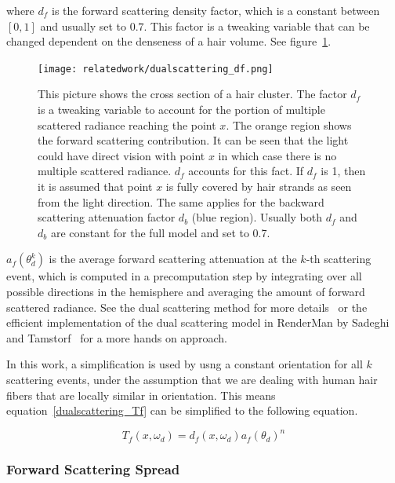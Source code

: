 where $d_f$ is the forward scattering density factor, which is a constant between $[0, 1]$ and usually set to $0.7$. This factor is a tweaking variable that can be changed dependent on the denseness of a hair volume. See figure~\ref{fig_df}.

\begin{figure}[h]
\begin{center}
\texttt{[image: relatedwork/dualscattering\_df.png]}
\end{center}
\caption{This picture shows the cross section of a hair cluster. The factor $d_f$ is a tweaking variable to account for the portion of multiple scattered radiance reaching the point $x$. The orange region shows the forward scattering contribution. It can be seen that the light could have direct vision with point $x$ in which case there is no multiple scattered radiance. $d_f$ accounts for this fact. If $d_f$ is 1, then it is assumed that point $x$ is fully covered by hair strands as seen from the light direction. The same applies for the backward scattering attenuation factor $d_b$ (blue region). Usually both $d_f$ and $d_b$ are constant for the full model and set to 0.7.}
\label{fig_df}
\end{figure}


$a_f(\theta_d^k)$ is the average forward scattering attenuation at the $k$-th scattering event, which is computed in a precomputation step by integrating over all possible directions in the hemisphere and averaging the amount of forward scattered radiance. See the dual scattering method for more details~\cite{zinke} or the efficient implementation of the dual scattering model in RenderMan by Sadeghi and Tamstorf~\cite{sadeghi} for a more hands on approach.

In this work, a simplification is used by usng a constant orientation for all $k$ scattering events, under the assumption that we are dealing with human hair fibers that are locally similar in orientation. This means equation~\ref{dualscattering_Tf} can be simplified to the following equation.

\begin{equation}
T_f(x, \omega_d) = d_f(x, \omega_d) a_f(\theta_d)^n
\label{forwardscattering}
\end{equation}

\subsubsection{Forward Scattering Spread}

